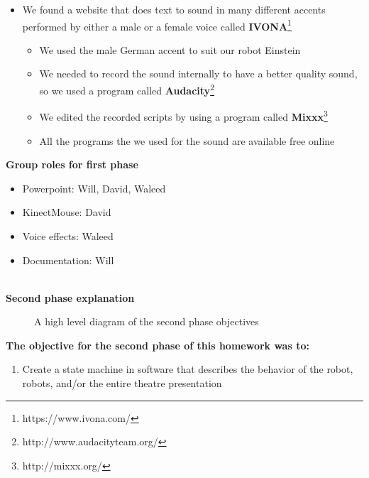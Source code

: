\documentclass[12pt]{article}
\begin{document}
\begin{description}
\begin{itemize}
\begin{itemize}
				\end{itemize}
			\item We found a website that does text to sound in many different accents performed by either a male or a female voice called \textbf{IVONA}\footnote{https://www.ivona.com/}
				\begin{itemize}
					\item We used the male German accent to suit our robot Einstein
					\item We needed to record the sound internally to have a better quality sound, so we used a program called \textbf{Audacity}\footnote{http://www.audacityteam.org/}
					\item We edited the recorded scripts by using a program called \textbf{Mixxx}\footnote{http://mixxx.org/}
					\item All the programs the we used for the sound are available free online
				\end{itemize}
		\end{itemize}
		\textbf{Group roles for first phase}
		\begin{itemize}
			\item Powerpoint: Will, David, Waleed
			\item KinectMouse: David
			\item Voice effects: Waleed
			\item Documentation: Will
		\end{itemize} \hfill \\
		\newpage
		\textbf{Second phase explanation}
		\begin{figure}[H]
			\centering
			\caption{A high level diagram of the second phase objectives}
		\end{figure}
		\textbf{The objective for the second phase of this homework was to:}
		\begin{enumerate}
			\item Create a state machine in software that describes the behavior of the robot, robots, and/or the entire theatre presentation

\end{enumerate}
\end{description}
\end{document}
